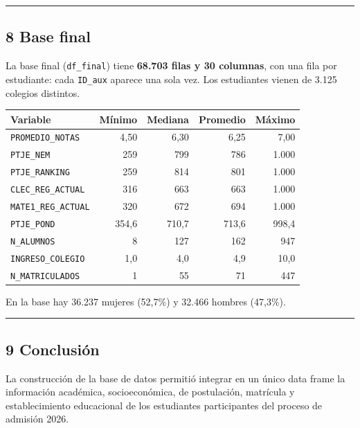 \documentclass[11pt]{article}
\begin{document}
\medskip\hrule\medskip

\subsection*{8 \; Base final}

La base final (\texttt{df\_final}) tiene \textbf{68.703 filas y 30
columnas}, con una fila por estudiante: cada \texttt{ID\_aux} aparece una
sola vez. Los estudiantes vienen de 3.125 colegios distintos.

\begin{center}
\begin{tabular}{lrrrr}
\toprule
\textbf{Variable} & \textbf{Mínimo} & \textbf{Mediana} & \textbf{Promedio} & \textbf{Máximo} \\
\midrule
\texttt{PROMEDIO\_NOTAS}   & 4,50  & 6,30  & 6,25  & 7,00 \\
\texttt{PTJE\_NEM}         & 259   & 799   & 786   & 1.000 \\
\texttt{PTJE\_RANKING}     & 259   & 814   & 801   & 1.000 \\
\texttt{CLEC\_REG\_ACTUAL} & 316   & 663   & 663   & 1.000 \\
\texttt{MATE1\_REG\_ACTUAL}& 320   & 672   & 694   & 1.000 \\
\texttt{PTJE\_POND}        & 354,6 & 710,7 & 713,6 & 998,4 \\
\texttt{N\_ALUMNOS}        & 8     & 127   & 162   & 947 \\
\texttt{INGRESO\_COLEGIO}  & 1,0   & 4,0   & 4,9   & 10,0 \\
\texttt{N\_MATRICULADOS}   & 1     & 55    & 71    & 447 \\
\bottomrule
\end{tabular}
\end{center}

En la base hay 36.237 mujeres (52,7\%) y 32.466 hombres (47,3\%).

\medskip\hrule\medskip

\subsection*{9 \; Conclusión}

La construcción de la base de datos permitió integrar en un único data
frame la información académica, socioeconómica, de postulación, matrícula
y establecimiento educacional de los estudiantes participantes del
proceso de admisión 2026.
\end{document}
